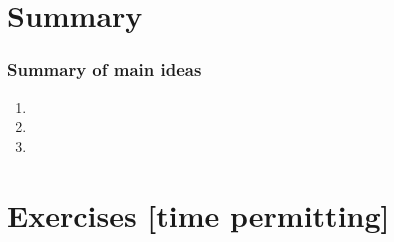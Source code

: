 \documentclass[slidestop,compress,mathserif,12pt,t,professionalfonts,xcolor=table]{beamer}
\begin{document}

\section{Summary}


\begin{frame}
\frametitle{Summary of main ideas}

\vfill

\begin{enumerate}

\item {}

\item {}

\item {}

\end{enumerate}

\vfill

\end{frame}


\section{Exercises [time permitting]}

\end{document}
